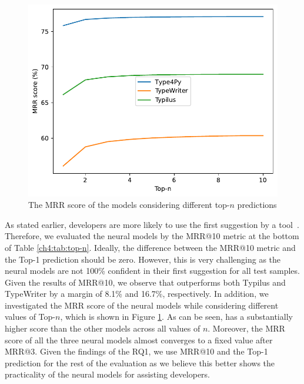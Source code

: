 \begin{figure}[!t]
	\centering
	\includegraphics[width=0.75\linewidth]{chapters/ch4/figs/top-n-MRR.pdf}
	\caption{The MRR score of the models considering different top-$n$ predictions}
	\label{ch4:fig:top-n-MRR}
\end{figure}

As stated earlier, developers are more likely to use the first suggestion by a tool~\cite{parnin2011automated}. Therefore, we evaluated the neural models by the MRR@10 metric at the bottom of Table \ref{ch4:tab:top-n}. Ideally, the difference between the MRR@10 metric and the Top-1 prediction should be zero. However, this is very challenging as the neural models are not 100\% confident in their first suggestion for all test samples. Given the results of MRR@10, we observe that \name outperforms both Typilus and TypeWriter by a margin of 8.1\% and 16.7\%, respectively. In addition, we investigated the MRR score of the neural models while considering different values of Top-$n$, which is shown in Figure \ref{ch4:fig:top-n-MRR}. As can be seen, \name has a substantially higher score than the other models across all values of $n$. Moreover, the MRR score of all the three neural models almost converges to a fixed value after MRR@3. Given the findings of the RQ1, we use MRR@10 and the Top-1 prediction for the rest of the evaluation as we believe this better shows the practicality of the neural models for assisting developers.

